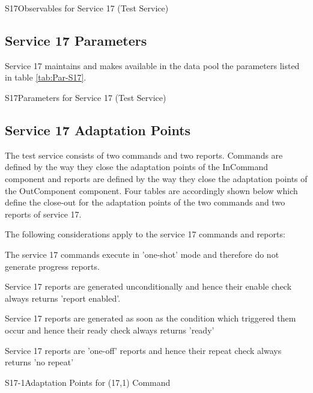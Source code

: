 \documentclass[a4paper,10pt]{article}
\newenvironment{fw_itemize}						%
{\begin{itemize}
  \setlength{\itemsep}{1mm}
  \setlength{\parskip}{0pt}
  \setlength{\parsep}{0pt}}
{\end{itemize}}
\newenvironment{cr_ap}[2]
{
\begin{longtable}{|l|p{4.7cm}|p{6.9cm}|}
\caption{#2}\label{tab:AP-#1} \\
\hline
\rowcolor{light-gray}
\textbf{AP ID} & \textbf{Adaptation Point} & \textbf{Default Value}\\
\hline\hline
\endfirsthead
\rowcolor{light-gray}
\textbf{AP ID} & \textbf{Adaptation Point} & \textbf{Default Value}\\
\hline\hline
\endhead
\DTLforeach*[\DTLiseq{\cat}{#1}]{dbAP}{\cat=Category,\origin=Origin,\id=Id,\ap=AP,\defValue=DefValue}
{\DTLiffirstrow{}{\\\hline}P-\cat-\id & \ap\ (\origin) & \defValue}\\\hline
}
{\end{longtable}}
\newenvironment{cr_obs}[2]
{
\begin{longtable}{|l|p{9.5cm}|}
\caption{#2}\label{tab:Obs-#1} \\
\hline
\rowcolor{light-gray}
\textbf{Name} & \textbf{Description}\\
\hline\hline
\endfirsthead
\rowcolor{light-gray}
\textbf{Name} & \textbf{Description}\\
\hline\hline
\endhead
\DTLforeach*[\DTLiseq{\cat}{#1}]{dbObs}{\cat=Category,\name=Name,\desc=Desc}
{\DTLiffirstrow{}{\\\hline}\texttt{\name} & \desc}\\\hline
}
{\end{longtable}}
\newenvironment{cr_par}[2]
{
\begin{longtable}{|l|p{9.5cm}|}
\caption{#2}\label{tab:Par-#1} \\
\hline
\rowcolor{light-gray}
\textbf{Name} & \textbf{Description}\\
\hline\hline
\endfirsthead
\rowcolor{light-gray}
\textbf{Name} & \textbf{Description}\\
\hline\hline
\endhead
\DTLforeach*[\DTLiseq{\cat}{#1}]{dbPar}{\cat=Category,\name=Name,\desc=Desc}
{\DTLiffirstrow{}{\\\hline}\texttt{\name} & \desc}\\\hline
}
{\end{longtable}}
\begin{document}
\begin{cr_obs}{S17}{Observables for Service 17 (Test Service)}
\end{cr_obs}

\subsection{Service 17 Parameters}\label{sec:serv17Par}
Service 17 maintains and makes available in the data pool the parameters listed in table \ref{tab:Par-S17}.

\begin{cr_par}{S17}{Parameters for Service 17 (Test Service)}
\end{cr_par}

\subsection{Service 17 Adaptation Points}\label{sec:serv17AP}
The test service consists of two commands and two reports. Commands are defined by the way they close the adaptation points of the InCommand component and reports are defined by the way they close the adaptation points of the OutComponent component. Four tables are accordingly shown below which define the close-out for the adaptation points of the two commands and two reports of service 17.

The following considerations apply to the service 17 commands and reports:

\begin{fw_itemize}
\item The service 17 commands execute in 'one-shot' mode and therefore do not generate progress reports.
\item Service 17 reports are generated unconditionally and hence their enable check always returns 'report enabled'.
\item Service 17 reports are generated as soon as the condition which triggered them occur and hence their ready check always returns 'ready'
\item Service 17 reports are 'one-off' reports and hence their repeat check always returns 'no repeat'
\end{fw_itemize}

\begin{cr_ap}{S17-1}{Adaptation Points for (17,1) Command}
\end{cr_ap}
\end{document}
